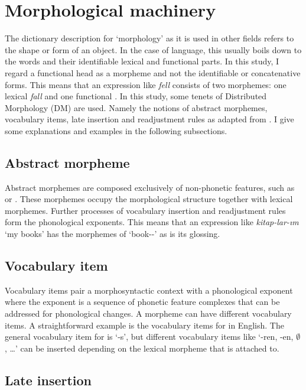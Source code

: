 \section{Morphological machinery}

The dictionary description for `morphology' as it is used in other fields refers to the shape or form of an object. In the case of language, this usually boils down to the words and their identifiable lexical and functional parts. In this study, I regard a functional head as a morpheme and not the identifiable or concatenative forms. This means that an expression like \textit{fell} consists of two morphemes: one lexical \textit{fall} and one functional {\Pst}. In this study, some tenets of Distributed Morphology (DM) \citep{halle1993distributed, halle1994some} are used. Namely the notions of abstract morphemes, vocabulary items, late insertion and readjustment rules as adapted from \citet{embick2005status}. I give some explanations and examples in the following subsections.


\subsection{Abstract morpheme}

Abstract morphemes are composed exclusively of non-phonetic features, such as {\Pst} or {\Pl}. These morphemes occupy the morphological structure together with lexical morphemes. Further processes of vocabulary insertion and readjustment rules form the phonological exponents. This means that an expression like \textit{kitap-lar-ım} `my books' has the morphemes of `book-{\Pl}-{\Poss}' as is its glossing. 

\subsection{Vocabulary item}

Vocabulary items pair a morphosyntactic context with a phonological exponent where the exponent is a sequence of phonetic feature complexes that can be addressed for phonological changes. A morpheme can have different vocabulary items. A straightforward example is the vocabulary items for {\Pl} in English. The general vocabulary item for {\Pl} is `-s', but  different vocabulary items like `-ren, -en, $\emptyset$, \ldots' can be inserted depending on the lexical morpheme that {\Pl} is attached to.

\subsection{Late insertion}

